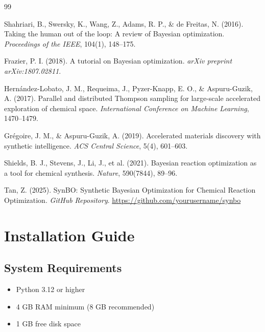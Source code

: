 \documentclass[12pt,a4paper]{article}
\begin{document}
\begin{thebibliography}{99}

Shahriari, B., Swersky, K., Wang, Z., Adams, R. P., \& de Freitas, N. (2016).
Taking the human out of the loop: A review of Bayesian optimization.
\textit{Proceedings of the IEEE}, 104(1), 148--175.

Frazier, P. I. (2018).
A tutorial on Bayesian optimization.
\textit{arXiv preprint arXiv:1807.02811}.

Hernández-Lobato, J. M., Requeima, J., Pyzer-Knapp, E. O., \& Aspuru-Guzik, A. (2017).
Parallel and distributed Thompson sampling for large-scale accelerated exploration of chemical space.
\textit{International Conference on Machine Learning}, 1470--1479.

Grégoire, J. M., \& Aspuru-Guzik, A. (2019).
Accelerated materials discovery with synthetic intelligence.
\textit{ACS Central Science}, 5(4), 601--603.

Shields, B. J., Stevens, J., Li, J., et al. (2021).
Bayesian reaction optimization as a tool for chemical synthesis.
\textit{Nature}, 590(7844), 89--96.

Tan, Z. (2025).
SynBO: Synthetic Bayesian Optimization for Chemical Reaction Optimization.
\textit{GitHub Repository}. \url{https://github.com/yourusername/synbo}

\end{thebibliography}

\appendix

\section{Installation Guide}

\subsection{System Requirements}

\begin{itemize}
    \item Python 3.12 or higher
    \item 4 GB RAM minimum (8 GB recommended)
    \item 1 GB free disk space
\end{itemize}
\end{document}
